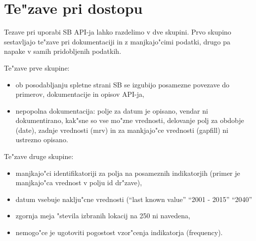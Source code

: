 \section{Te"zave pri dostopu}


Tezave pri uporabi SB API-ja lahko razdelimo v dve skupini. Prvo skupino
sestavljajo te"zave pri dokumentaciji in z manjkajo"cimi podatki, drugo pa
napake v samih pridobljenih podatkih.

Te"zave prve skupine:

\begin{itemize}  
\item ob posodabljanju spletne strani SB se izgubijo posamezne povezave do 
  primerov, dokumentacije in opisov API-ja,
\item nepopolna dokumentacija:
\subitem polje za datum je opisano, vendar ni dokumentirano, kak"sne so vse mo"zne 
    vrednosti,
\subitem delovanje polj za obdobje (date), zadnje vrednosti (mrv) in za mankjajo"ce
    vrednosti (gapfill) ni ustrezno opisano.
\end{itemize}  

Te"zave druge skupine:


\begin{itemize}  
\item manjkajo"ci identifikatoriji za polja na posameznih indikatorjih (primer je
  manjkajo"ca vrednost v polju id dr"zave),
\item datum vsebuje naklju"cne vrednosti (``last known value'' ``2001 - 2015'' ``2040''
\item zgornja meja "stevila izbranih lokacij na 250 ni navedena,
\item nemogo"ce je ugotoviti pogostost vzor"cenja indikatorja (frequency).
\end{itemize}  







